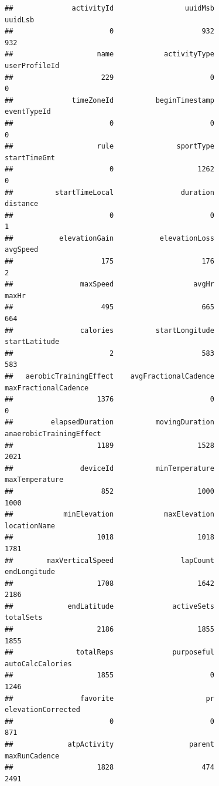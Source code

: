 \documentclass[
]{book}
\begin{document}
\begin{verbatim}
##              activityId                 uuidMsb                 uuidLsb 
##                       0                     932                     932 
##                    name            activityType           userProfileId 
##                     229                       0                       0 
##              timeZoneId          beginTimestamp             eventTypeId 
##                       0                       0                       0 
##                    rule               sportType            startTimeGmt 
##                       0                    1262                       0 
##          startTimeLocal                duration                distance 
##                       0                       0                       1 
##           elevationGain           elevationLoss                avgSpeed 
##                     175                     176                       2 
##                maxSpeed                   avgHr                   maxHr 
##                     495                     665                     664 
##                calories          startLongitude           startLatitude 
##                       2                     583                     583 
##   aerobicTrainingEffect    avgFractionalCadence    maxFractionalCadence 
##                    1376                       0                       0 
##         elapsedDuration          movingDuration anaerobicTrainingEffect 
##                    1189                    1528                    2021 
##                deviceId          minTemperature          maxTemperature 
##                     852                    1000                    1000 
##            minElevation            maxElevation            locationName 
##                    1018                    1018                    1781 
##        maxVerticalSpeed                lapCount            endLongitude 
##                    1708                    1642                    2186 
##             endLatitude              activeSets               totalSets 
##                    2186                    1855                    1855 
##               totalReps              purposeful        autoCalcCalories 
##                    1855                       0                    1246 
##                favorite                      pr      elevationCorrected 
##                       0                       0                     871 
##             atpActivity                  parent           maxRunCadence 
##                    1828                     474                    2491 

\end{verbatim}
\end{document}
